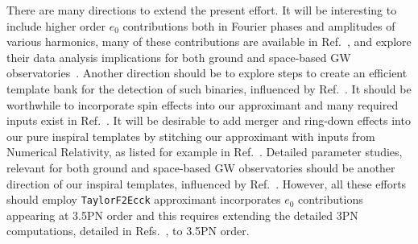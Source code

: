 \documentclass[aps,prd,twocolumn,superscriptaddress,groupedaddress,nofootinbib,showpacs,eqsecnum,useAms]{revtex4-2}
\begin{document}
There are many directions to extend the present effort. 
It will be interesting  to include higher order 
$e_0$ contributions both in Fourier phases and amplitudes of various harmonics,
many of these contributions  are available in Ref.~\cite{TGHH}, 
and explore their data analysis implications for both ground and space-based GW observatories~\cite{Paul2023, BBG23}.
Another direction should be to explore steps to create an efficient 
template bank for the detection of such binaries, influenced by Ref.~\cite{Phukon2025}.
It should be worthwhile to 
incorporate spin effects into our approximant and many required inputs 
exist in Ref.~\cite{Henry2023,sridhar2024}.
It will be desirable to add merger and ring-down effects into our pure inspiral templates by stitching 
our approximant with inputs from Numerical Relativity, as listed for example in Ref.~\cite{ficarra2025}.
Detailed parameter studies, relevant for both ground and space-based GW observatories should be another direction of our inspiral templates, influenced by Ref.~\cite{Paul2023, BBG23}.
However, all these efforts  should employ  \texttt{TaylorF2Ecck} approximant 
incorporates $e_0$ contributions appearing at 3.5PN order and this requires extending the detailed 3PN computations, detailed in Refs.~\cite{Arun09}, to 3.5PN order.
\end{document}
